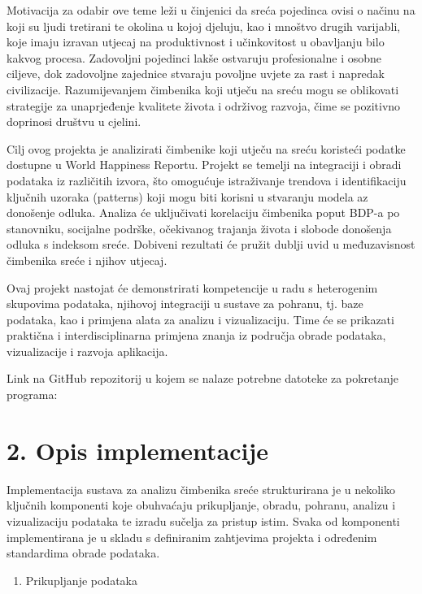 \documentclass[11pt]{article}
\providecommand{\tightlist}{%
      \setlength{\itemsep}{0pt}\setlength{\parskip}{0pt}}
\begin{document}
Motivacija za odabir ove teme leži u činjenici da sreća pojedinca ovisi
o načinu na koji su ljudi tretirani te okolina u kojoj djeluju, kao i
mnoštvo drugih varijabli, koje imaju izravan utjecaj na produktivnost i
učinkovitost u obavljanju bilo kakvog procesa. Zadovoljni pojedinci
lakše ostvaruju profesionalne i osobne ciljeve, dok zadovoljne zajednice
stvaraju povoljne uvjete za rast i napredak civilizacije. Razumijevanjem
čimbenika koji utječu na sreću mogu se oblikovati strategije za
unaprjeđenje kvalitete života i održivog razvoja, čime se pozitivno
doprinosi društvu u cjelini.

Cilj ovog projekta je analizirati čimbenike koji utječu na sreću
koristeći podatke dostupne u World Happiness Reportu. Projekt se temelji
na integraciji i obradi podataka iz različitih izvora, što omogućuje
istraživanje trendova i identifikaciju ključnih uzoraka (patterns) koji
mogu biti korisni u stvaranju modela az donošenje odluka. Analiza će
uključivati korelaciju čimbenika poput BDP-a po stanovniku, socijalne
podrške, očekivanog trajanja života i slobode donošenja odluka s
indeksom sreće. Dobiveni rezultati će pružit dublji uvid u međuzavisnost
čimbenika sreće i njihov utjecaj.

Ovaj projekt nastojat će demonstrirati kompetencije u radu s heterogenim
skupovima podataka, njihovoj integraciji u sustave za pohranu, tj. baze
podataka, kao i primjena alata za analizu i vizualizaciju. Time će se
prikazati praktična i interdisciplinarna primjena znanja iz područja
obrade podataka, vizualizacije i razvoja aplikacija.

Link na GitHub repozitorij u kojem se nalaze potrebne datoteke za
pokretanje programa:

    \hypertarget{opis-implementacije}{%
\section{2. Opis implementacije}\label{opis-implementacije}}

Implementacija sustava za analizu čimbenika sreće strukturirana je u
nekoliko ključnih komponenti koje obuhvaćaju prikupljanje, obradu,
pohranu, analizu i vizualizaciju podataka te izradu sučelja za pristup
istim. Svaka od komponenti implementirana je u skladu s definiranim
zahtjevima projekta i određenim standardima obrade podataka.

\begin{enumerate}
\def\labelenumi{\arabic{enumi}.}
\tightlist
\item
  Prikupljanje podataka
\end{enumerate}
\end{document}
